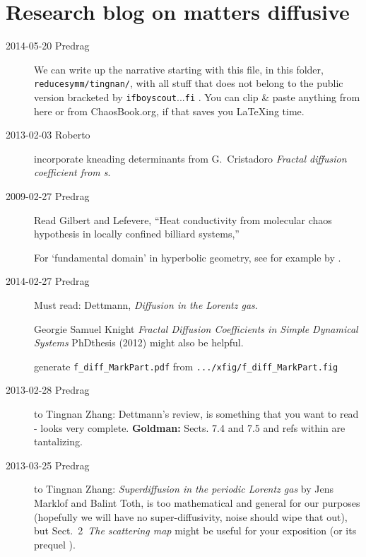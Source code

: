 
	
\chapter{Research blog on matters diffusive}
\label{c-DailyBlog}




\begin{description}

\item[2014-05-20 Predrag]
We can write up the narrative starting with this file,
in this folder, \texttt{reducesymm/tingnan/},
with all stuff that does not belong to the public version
bracketed by \texttt{ifboyscout}...\texttt{fi} .
You can clip \& paste anything from here or from
ChaosBook.org, if that saves you LaTeXing time.

\item[2013-02-03 Roberto]
incorporate kneading determinants from
G.~Cristadoro
{\em Fractal diffusion coefficient from {\dzeta}s}.

\item[2009-02-27 Predrag]
Read  Gilbert  and Lefevere,
    ``Heat conductivity from molecular chaos hypothesis
             in locally confined billiard systems,''

For `fundamental domain' in hyperbolic geometry, see for example
by .

\item[2014-02-27 Predrag] Must read:
Dettmann, {\em Diffusion in the {Lorentz} gas}.

Georgie Samuel Knight {\em Fractal Diffusion Coefficients in Simple
Dynamical Systems}
{PhDthesis} (2012) might also be helpful.

generate \texttt{f\_diff\_MarkPart.pdf}
from \texttt{.../xfig/f\_diff\_MarkPart.fig}

\item[2013-02-28 Predrag] to Tingnan Zhang:
Dettmann's review,  is something that you
want to read - looks very complete. {\bf Goldman:} Sects. 7.4 and 7.5 and
refs within are tantalizing.

\item[2013-03-25 Predrag] to Tingnan Zhang:
{\em Superdiffusion in the periodic Lorentz gas} by
Jens Marklof and Balint Toth,  	 is too mathematical and
general for our purposes (hopefully we will have no super-diffusivity, noise
should wipe that out), but
Sect.~2~{\em The scattering map} might be useful for your exposition
(or its prequel  ).


\end{description}
